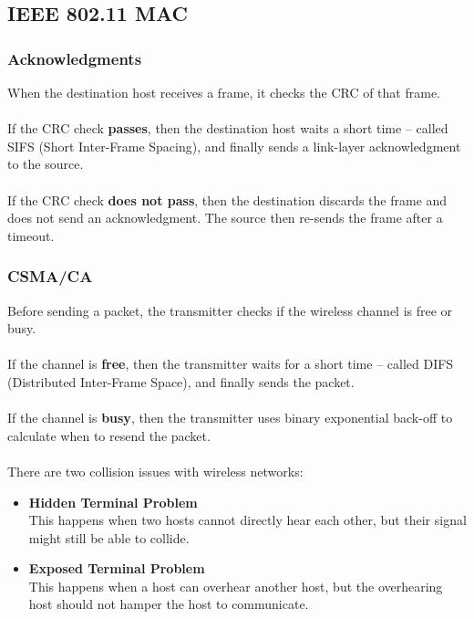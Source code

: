 \documentclass{article}
\begin{document}
\subsection{IEEE 802.11 MAC}
\subsubsection{Acknowledgments}
When the destination host receives a frame, it checks the CRC of that frame. \\ \\
If the CRC check \textbf{passes}, then the destination host waits a short time -- called SIFS (Short Inter-Frame Spacing), and finally sends a link-layer acknowledgment to the source. \\ \\
If the CRC check \textbf{does not pass}, then the destination discards the frame and does not send an acknowledgment. The source then re-sends the frame after a timeout.

\subsubsection{CSMA/CA}
Before sending a packet, the transmitter checks if the wireless channel is free or busy. \\ \\
If the channel is \textbf{free}, then the transmitter waits for a short time -- called DIFS (Distributed Inter-Frame Space), and finally sends the packet. \\ \\
If the channel is \textbf{busy}, then the transmitter uses binary exponential back-off to calculate when to resend the packet. \\ \\
There are two collision issues with wireless networks:

\begin{itemize}
	\item \textbf{Hidden Terminal Problem}
	\vspace{.2cm} \\
	This happens when two hosts cannot directly hear each other, but their signal might still be able to collide.
	
	\item \textbf{Exposed Terminal Problem}
	\vspace{.2cm} \\
	This happens when a host can overhear another host, but the overhearing host should not hamper the host to communicate.
\end{itemize}
\end{document}
